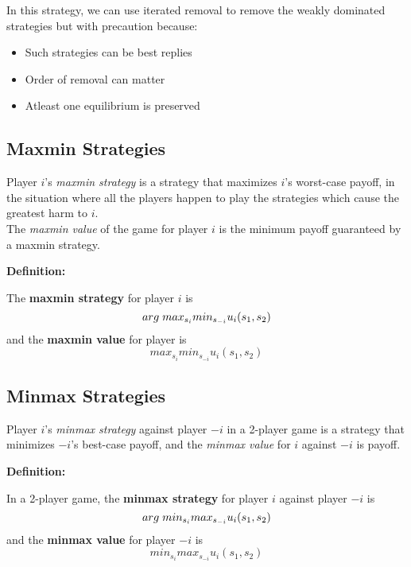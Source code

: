 In this strategy, we can use iterated removal to remove the weakly dominated strategies but with precaution because:

\begin{itemize}
\item Such strategies can be best replies
\item Order of removal can matter
\item Atleast one equilibrium is preserved
\end{itemize}

\subsection{Maxmin Strategies}

Player $i$'s \textit{maxmin strategy} is a strategy that maximizes $i$'s worst-case payoff, in the situation where all the players happen to play the strategies which cause the greatest harm to $i$.\\

The \textit{maxmin value} of the game for player $i$ is the minimum payoff guaranteed by a maxmin strategy.\\
\begin{flushleft}
\textbf{Definition:}
\end{flushleft}
The \textbf{maxmin strategy} for player $i$ is $$arg \hspace{0.1cm}max_{s_i} min_{s_{-i}} u_i(s_1, s_2)$$ and the \textbf{maxmin value} for player is  $$max_{s_i} min_{s_{-i}} u_i(s_1, s_2)$$

\subsection{Minmax Strategies}

Player $i$'s \textit{minmax strategy} against player $-i$ in a 2-player game is a strategy that minimizes $-i$'s best-case payoff, and the \textit{minmax value} for $i$ against $-i$ is payoff.

\begin{flushleft}
\textbf{Definition:}
\end{flushleft}
In a 2-player game, the \textbf{minmax strategy} for player $i$ against player $-i$ is $$arg \hspace{0.1cm}min_{s_i} max_{s_{-i}} u_i(s_1, s_2)$$ and the \textbf{minmax value} for player $-i$ is  $$min_{s_i} max_{s_{-i}} u_i(s_1, s_2)$$

